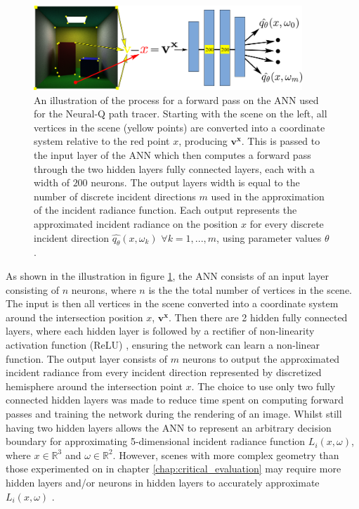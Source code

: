 \documentclass[../dissertation.tex]{subfiles}
\begin{document}
\begin{figure}[h]
\centering
\includegraphics[width=0.9\textwidth]{images/fwd_pass_process.png}   
\caption{An illustration of the process for a forward pass on the ANN used for the Neural-Q path tracer. Starting with the scene on the left, all vertices in the scene (yellow points) are converted into a coordinate system relative to the red point $x$, producing $\mathbf{v^x}$. This is passed to the input layer of the ANN which then computes a forward pass through the two hidden layers fully connected layers, each with a width of $200$ neurons. The output layers width is equal to the number of discrete incident directions $m$ used in the approximation of the incident radiance function. Each output represents the approximated incident radiance on the position $x$ for every discrete incident direction $\hat{q_\theta}(x, \omega_k)$ $\forall k = 1, ..., m$, using parameter values $\theta$.}
\label{fig:nn_radiance_estimate_illustration}
\end{figure}

As shown in the illustration in figure \ref{fig:nn_radiance_estimate_illustration}, the ANN consists of an input layer consisting of $n$ neurons, where $n$ is the the total number of vertices in the scene. The input is then all vertices in the scene converted into a coordinate system around the intersection position $x$, $\mathbf{v^x}$. Then there are 2 hidden fully connected layers, where each hidden layer is followed by a rectifier of non-linearity activation function (ReLU) \cite{nair2010rectified}, ensuring the network can learn a non-linear function. The output layer consists of $m$ neurons to output the approximated incident radiance from every incident direction represented by discretized hemisphere around the intersection point $x$. The choice to use only two fully connected hidden layers was made to reduce time spent on computing forward passes and training the network during the rendering of an image. Whilst still having two hidden layers allows the ANN to represent an arbitrary decision boundary for approximating 5-dimensional incident radiance function $L_i(x, \omega)$, where $x \in \mathbb{R}^3$  and $\omega \in \mathbb{R}^2$. However, scenes with more complex geometry than those experimented on in chapter \ref{chap:critical_evaluation} may require more hidden layers and/or neurons in hidden layers to accurately approximate $L_i(x, \omega)$ \cite{ren2013global}.
\end{document}
